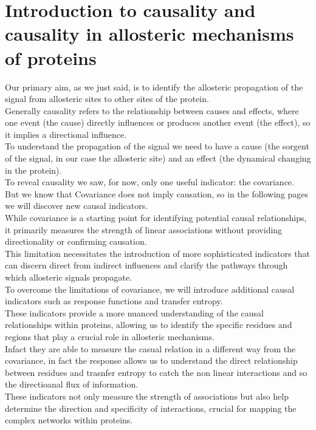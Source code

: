 \documentclass[English, Lau, oneside]{sapthesis}
\begin{document}
\newpage
\chapter{Introduction to causality and causality in allosteric mechanisms of proteins}
\noindent Our primary aim, as we just said, is to identify  the allosteric propagation of the signal from allosteric sites to other sites of the protein.\\
Generally causality refers to the relationship between causes and effects, where one event (the cause) directly influences or produces another event (the effect), so it implies a directional influence.\\
To understand the propagation of the signal we need to have a cause (the sorgent of the signal, in our case the allosteric site) and an effect (the dynamical changing in the protein).\\
To reveal causality we saw, for now, only one useful indicator: the covariance.\\
But we know that Covariance does not imply causation, so in the following pages we will discover new causal indicators.\\
While covariance is a starting point for identifying potential causal relationships, it primarily measures the strength of linear associations without providing directionality or confirming causation.\\
This limitation necessitates the introduction of more sophisticated indicators that can discern direct from indirect influences and clarify the pathways through which allosteric signals propagate.\\
To overcome the limitations of covariance, we will introduce additional causal indicators such as response functions and transfer entropy. \\
These indicators provide a more nuanced understanding of the causal relationships within proteins, allowing us to identify the specific residues and regions that play a crucial role in allosteric mechanisms.\\
Infact they are able to measure the casual relation in a different way from the covariance, in fact the response allows us to understand the direct relationship between residues and trasnfer entropy to catch the non linear interactions and so the directioanal flux of information. \\
These indicators not only measure the strength of associations but also help determine the direction and specificity of interactions, crucial for mapping the complex networks within proteins.
\end{document}

